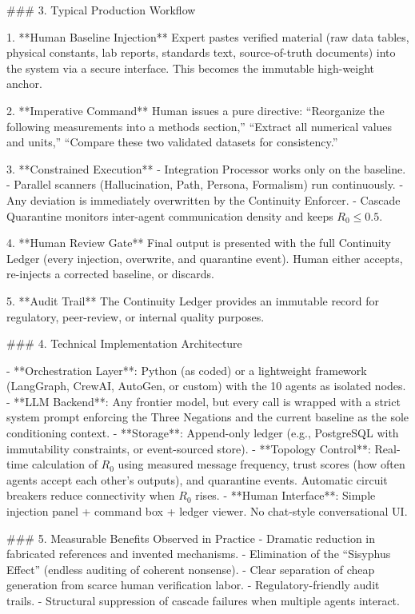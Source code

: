 ### 3. Typical Production Workflow

1. **Human Baseline Injection**  
   Expert pastes verified material (raw data tables, physical constants, lab reports, standards text, source-of-truth documents) into the system via a secure interface. This becomes the immutable high-weight anchor.

2. **Imperative Command**  
   Human issues a pure directive: “Reorganize the following measurements into a methods section,” “Extract all numerical values and units,” “Compare these two validated datasets for consistency.”

3. **Constrained Execution**  
   - Integration Processor works only on the baseline.  
   - Parallel scanners (Hallucination, Path, Persona, Formalism) run continuously.  
   - Any deviation is immediately overwritten by the Continuity Enforcer.  
   - Cascade Quarantine monitors inter-agent communication density and keeps \( R_0 \le 0.5 \).

4. **Human Review Gate**  
   Final output is presented with the full Continuity Ledger (every injection, overwrite, and quarantine event). Human either accepts, re-injects a corrected baseline, or discards.

5. **Audit Trail**  
   The Continuity Ledger provides an immutable record for regulatory, peer-review, or internal quality purposes.

### 4. Technical Implementation Architecture

- **Orchestration Layer**: Python (as coded) or a lightweight framework (LangGraph, CrewAI, AutoGen, or custom) with the 10 agents as isolated nodes.
- **LLM Backend**: Any frontier model, but every call is wrapped with a strict system prompt enforcing the Three Negations and the current baseline as the sole conditioning context.
- **Storage**: Append-only ledger (e.g., PostgreSQL with immutability constraints, or event-sourced store).
- **Topology Control**: Real-time calculation of \( R_0 \) using measured message frequency, trust scores (how often agents accept each other’s outputs), and quarantine events. Automatic circuit breakers reduce connectivity when \( R_0 \) rises.
- **Human Interface**: Simple injection panel + command box + ledger viewer. No chat-style conversational UI.

### 5. Measurable Benefits Observed in Practice
- Dramatic reduction in fabricated references and invented mechanisms.
- Elimination of the “Sisyphus Effect” (endless auditing of coherent nonsense).
- Clear separation of cheap generation from scarce human verification labor.
- Regulatory-friendly audit trails.
- Structural suppression of cascade failures when multiple agents interact.

